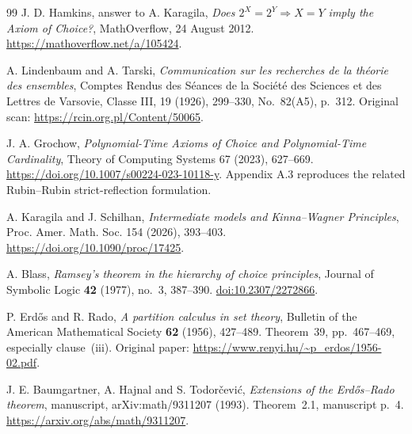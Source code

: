 \begin{thebibliography}{99}
 J. D. Hamkins, answer to A. Karagila, \emph{Does $2^X=2^Y\Rightarrow X=Y$ imply the Axiom of Choice?}, MathOverflow, 24 August 2012. \url{https://mathoverflow.net/a/105424}.

 A. Lindenbaum and A. Tarski, \emph{Communication sur les recherches de la th\'eorie des ensembles}, Comptes Rendus des S\'eances de la Soci\'et\'e des Sciences et des Lettres de Varsovie, Classe III, 19 (1926), 299--330, No.~82(A5), p.~312. Original scan: \url{https://rcin.org.pl/Content/50065}.

 J. A. Grochow, \emph{Polynomial-Time Axioms of Choice and Polynomial-Time Cardinality}, Theory of Computing Systems 67 (2023), 627--669. \url{https://doi.org/10.1007/s00224-023-10118-y}. Appendix A.3 reproduces the related Rubin--Rubin strict-reflection formulation.

 A. Karagila and J. Schilhan, \emph{Intermediate models and Kinna--Wagner Principles}, Proc. Amer. Math. Soc. 154 (2026), 393--403. \url{https://doi.org/10.1090/proc/17425}.

 A. Blass, \emph{Ramsey's theorem in the hierarchy of choice principles}, Journal of Symbolic Logic \textbf{42} (1977), no.~3, 387--390. \href{https://doi.org/10.2307/2272866}{doi:10.2307/2272866}.

 P. Erd\H{o}s and R. Rado, \emph{A partition calculus in set theory}, Bulletin of the American Mathematical Society \textbf{62} (1956), 427--489. Theorem~39, pp.~467--469, especially clause~(iii). Original paper: \url{https://www.renyi.hu/~p_erdos/1956-02.pdf}.

 J. E. Baumgartner, A. Hajnal and S. Todor\v{c}evi\'c, \emph{Extensions of the Erd\H{o}s--Rado theorem}, manuscript, arXiv:math/9311207 (1993). Theorem~2.1, manuscript p.~4. \url{https://arxiv.org/abs/math/9311207}.
\end{thebibliography}
